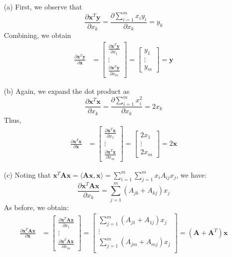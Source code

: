 \documentclass[submit]{harvardml}
\renewcommand{\v}[1]{\mathbf{#1}}
\begin{document}
\begin{enumerate}
	\item[(a)] First, we observe that
	\[\frac{\partial \v x^T\v y}{\partial x_k} = \frac{\partial \sum_{i=1}^{m} x_i y_i}{\partial x_k} = y_k\]
	Combining, we obtain
	\begin{align*}
	\frac{\partial \v x^T\v y}{\partial \v x} &= \begin{bmatrix}
	\frac{\partial \v x^T\v y}{\partial x_1} \\
	\vdots \\
	\frac{\partial \v x^T\v y}{\partial x_m}
	\end{bmatrix} 
	= \begin{bmatrix}
	y_1 \\
	\vdots \\
	y_m
	\end{bmatrix} = \v y
	\end{align*}
	
	\item[(b)] Again, we expand the dot product as
	\[\frac{\partial \v x^T\v x}{\partial x_k} = \frac{\partial \sum_{i=1}^{m} x_i^2}{\partial x_k} = 2x_k\]
	Thus,
	\begin{align*}
	\frac{\partial \v x^T\v x}{\partial \v x} &= \begin{bmatrix}
	\frac{\partial \v x^T\v x}{\partial x_1} \\
	\vdots \\
	\frac{\partial \v x^T\v x}{\partial x_m}
	\end{bmatrix} = \begin{bmatrix}
	2x_1 \\
	\vdots \\
	2x_m
	\end{bmatrix} = 2 \v x
	\end{align*}
	
	\item[(c)] Noting that $\v x^T\v A\v x = \langle \v A\v x, \v x\rangle = \sum_{i=1}^{m} \sum_{j=1}^m x_i A_{ij} x_j$, we have:
	\[
	\frac{\partial \v x^T\v A\v x}{\partial x_k} = \sum_{j=1}^m (A_{jk} + A_{kj}) x_j
	\]
	As before, we obtain:
	\begin{align*}
	\frac{\partial \v x^T\v A\v x}{\partial \v x} &= \begin{bmatrix}
	\frac{\partial \v x^T\v A\v x}{\partial x_1} \\
	\vdots \\
	\frac{\partial \v x^T\v A\v x}{\partial x_m}
	\end{bmatrix} 
	= \begin{bmatrix}
	\sum_{j=1}^m (A_{j1} + A_{1j}) x_j \\
	\vdots \\
	\sum_{j=1}^m (A_{jm} + A_{mj}) x_j \\
	\end{bmatrix} = (\v A + \v A^T) \v x
	\end{align*}
\end{enumerate}
\end{document}
